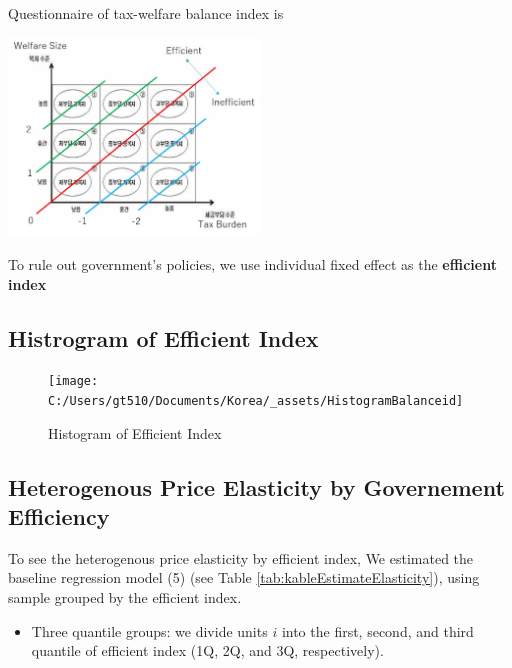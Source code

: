 \documentclass[ review  , 3p ]{elsarticle}
\providecommand{\tightlist}{%
  \setlength{\itemsep}{0pt}\setlength{\parskip}{0pt}}
\begin{document}
  Questionnaire of tax-welfare balance index is
  
  \includegraphics[width=0.5\textwidth,height=\textheight]{_assets/BalanceQuestion.jpg}
  
  To rule out government's policies, we use individual fixed effect as the \textbf{efficient index}
  
  \hypertarget{histrogram-of-efficient-index}{%
  \subsection{Histrogram of Efficient Index}\label{histrogram-of-efficient-index}}
  
  \begin{figure}
  
  {\centering \texttt{[image: C:/Users/gt510/Documents/Korea/\_assets/HistogramBalanceid]} 
  
  }
  
  \caption{Histogram of Efficient Index}\label{fig:unnamed-chunk-6}
  \end{figure}
  
  \hypertarget{heterogenous-price-elasticity-by-governement-efficiency}{%
  \subsection{Heterogenous Price Elasticity by Governement Efficiency}\label{heterogenous-price-elasticity-by-governement-efficiency}}
  
  To see the heterogenous price elasticity by efficient index,
  We estimated the baseline regression model (5) (see Table \ref{tab:kableEstimateElasticity}),
  using sample grouped by the efficient index.
  
  \begin{itemize}
  \tightlist
  \item
    Three quantile groups: we divide units \(i\) into the first, second, and third quantile of efficient index (1Q, 2Q, and 3Q, respectively).
  \end{itemize}
  
\end{document}
